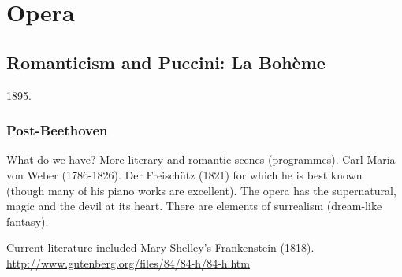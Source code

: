 
\chapter{Opera}
\label{opera}


\section{Romanticism and Puccini: La Boh\`eme}
1895. 

\subsection{Post-Beethoven}
What do we have?
More literary and romantic scenes (programmes).
Carl Maria von Weber (1786-1826). Der Freisch\"utz (1821) for which he is best known (though many of his piano works are excellent). The opera has the supernatural, magic and  the devil at its heart. There are elements of surrealism (dream-like fantasy). 

Current literature included Mary Shelley's Frankenstein (1818).  
\url{http://www.gutenberg.org/files/84/84-h/84-h.htm}

 
